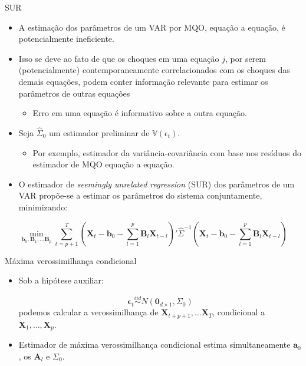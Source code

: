 \documentclass[11pt]{beamer}
\begin{document}
\begin{frame}{SUR}
	\begin{itemize}
		\item A estimação dos parâmetros de um VAR por MQO, equação a equação, é potencialmente ineficiente.
					\item Isso se deve ao fato de que os choques em uma equação $j$, por serem (potencialmente) contemporaneamente correlacionados com os choques das demais equações, podem conter informação relevante para estimar os parâmetros de outras equações
		\begin{itemize}
		\item Erro em uma equação é informativo sobre a outra equação.
		\end{itemize}
		\item Seja $\hat \Sigma_0$ um estimador preliminar de $\mathbb{V}(\epsilon_t)$.
		\begin{itemize}
			\item Por exemplo, estimador da variância-covariância com base nos resíduos do estimador de MQO equação a equação.
		\end{itemize}
		\item O estimador de \textit{seemingly unrelated regression} (SUR) dos parâmetros de um VAR propõe-se a estimar os parâmetros do sistema {\color{blue}conjuntamente}, minimizando:
	\end{itemize}		$$\min_{\boldsymbol{b}_0, \boldsymbol{B}_1,\ldots \boldsymbol{B}_p} \sum_{t=p+1}^T \left(\boldsymbol{X}_t - \boldsymbol{b}_0 -  \sum_{l=1}^p\boldsymbol{B}_l \boldsymbol{X}_{t-l}\right)' \hat \Sigma^{-1} \left(\boldsymbol{X}_t - \boldsymbol{b}_0 -  \sum_{l=1}^p\boldsymbol{B}_l \boldsymbol{X}_{t-l}\right)$$
\end{frame}
\begin{frame}{Máxima verossimilhança condicional}
\begin{itemize}
	\item Sob a hipótese auxiliar:
	
	$$\boldsymbol{\epsilon}_t \overset{iid}{\sim} N(\boldsymbol{0}_{d\times 1}, \Sigma_0)$$
	podemos calcular a verossimilhança de $\boldsymbol{X}_{t+p+1},\ldots \boldsymbol{X}_{T}$, condicional a $\boldsymbol{X}_1,\ldots, \boldsymbol{X}_p$.
	\item Estimador de máxima verossimilhança condicional estima {\color{blue}simultaneamente} $\boldsymbol{a}_0$, os $\boldsymbol{A}_l$  e $\Sigma_0$.
\end{itemize}
\end{frame}
\end{document}
